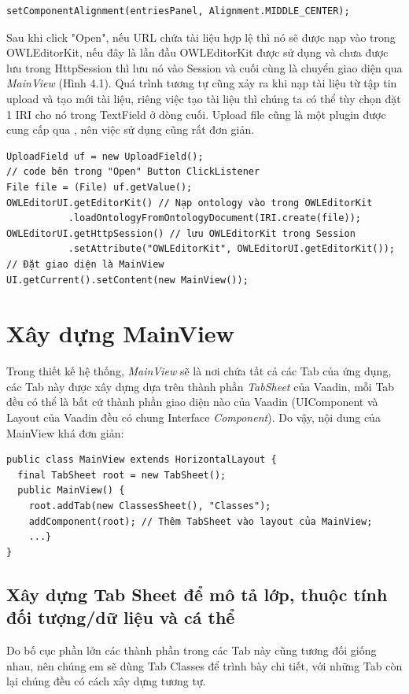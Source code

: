\begin{verbatim}
setComponentAlignment(entriesPanel, Alignment.MIDDLE_CENTER);
\end{verbatim}
Sau khi click "Open", nếu URL chứa tài liệu hợp lệ thì nó sẽ được nạp vào trong OWLEditorKit, nếu đây là lần đầu OWLEditorKit được sử dụng và chưa được lưu trong HttpSession thì lưu nó vào Session và cuối cùng là chuyển giao diện qua \textit{MainView} (Hình 4.1). Quá trình tương tự cũng xảy ra khi nạp tài liệu từ tập tin upload và tạo mới tài liệu, riêng việc tạo tài liệu thì chúng ta có thể tùy chọn đặt 1 IRI cho nó trong TextField ở dòng cuối. Upload file cũng là một plugin được cung cấp qua \cite{vaadindirectory}, nên việc sử dụng cũng rất đơn giản.
\begin{verbatim}
UploadField uf = new UploadField();
// code bên trong "Open" Button ClickListener
File file = (File) uf.getValue();
OWLEditorUI.getEditorKit() // Nạp ontology vào trong OWLEditorKit
           .loadOntologyFromOntologyDocument(IRI.create(file));
OWLEditorUI.getHttpSession() // lưu OWLEditorKit trong Session
           .setAttribute("OWLEditorKit", OWLEditorUI.getEditorKit());
// Đặt giao diện là MainView 
UI.getCurrent().setContent(new MainView());                    
\end{verbatim}

\section{Xây dựng MainView}
Trong thiết kế hệ thống, \textit{MainView} sẽ là nơi chứa tất cả các Tab của ứng dụng, các Tab này được xây dựng dựa trên thành phần \textit{TabSheet} của Vaadin, mỗi Tab đều có thể là bất cứ thành phần giao diện nào của Vaadin (UIComponent và Layout của Vaadin đều có chung Interface \textit{Component}). Do vậy, nội dung của MainView khá đơn giản:
\begin{verbatim}
public class MainView extends HorizontalLayout {
  final TabSheet root = new TabSheet();
  public MainView() {
    root.addTab(new ClassesSheet(), "Classes");
    addComponent(root); // Thêm TabSheet vào layout của MainView;
    ...}
} 
\end{verbatim}
\subsection{Xây dựng Tab Sheet để mô tả lớp, thuộc tính đối tượng/dữ liệu và cá thể}
Do bố cục phần lớn các thành phần trong các Tab này cũng tương đối giống nhau, nên chúng em sẽ dùng Tab Classes để trình bày chi tiết, với những Tab còn lại chúng đều có cách xây dựng tương tự.
